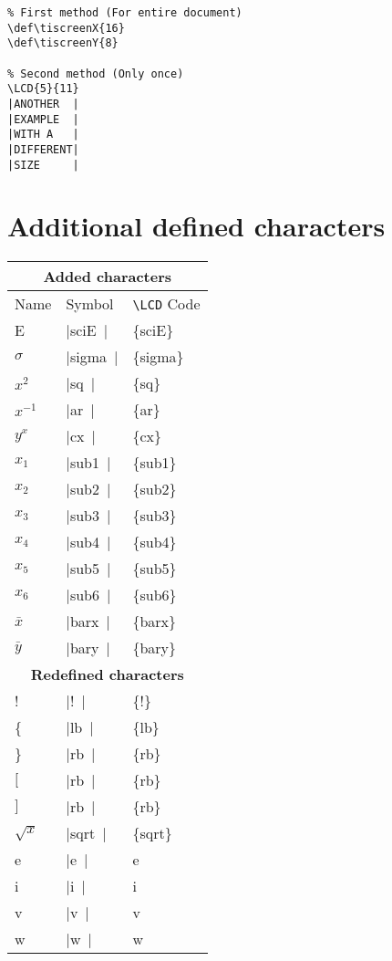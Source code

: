 \documentclass[a4paper,12pt]{article}
\newcommand{\LCDsymb}[1]{\large \textLCD{1}|{#1}~|}
\newcommand{\LCDcmd}{\texttt{\textbackslash LCD}}
\begin{document}
\begin{Verbatim}
% First method (For entire document)
\def\tiscreenX{16}
\def\tiscreenY{8}

% Second method (Only once)
\LCD{5}{11}
|ANOTHER  |
|EXAMPLE  |
|WITH A   |
|DIFFERENT|
|SIZE     |
\end{Verbatim}

\section{Additional defined characters} 
\begin{center}
	\begin{tabular}{|l|l|>{\ttfamily}l|}
		\multicolumn{3}{c}{\textbf{Added characters}} \\
		\hline
		Name       & Symbol          &\textnormal{\LCDcmd{} Code} \\
		\hline
		E          & \LCDsymb{sciE}  & \{sciE\} \\
		$\sigma$   & \LCDsymb{sigma} & \{sigma\} \\
		$x^2$      & \LCDsymb{sq}    & \{sq\} \\
		$x^{-1}$   & \LCDsymb{ar}    & \{ar\} \\
		$y^x$      & \LCDsymb{cx}    & \{cx\} \\
		$x_1$      & \LCDsymb{sub1}  & \{sub1\} \\
		$x_2$      & \LCDsymb{sub2}  & \{sub2\} \\
		$x_3$      & \LCDsymb{sub3}  & \{sub3\} \\
		$x_4$      & \LCDsymb{sub4}  & \{sub4\} \\
		$x_5$      & \LCDsymb{sub5}  & \{sub5\} \\
		$x_6$      & \LCDsymb{sub6}  & \{sub6\} \\
		$\bar x$   & \LCDsymb{barx}  & \{barx\} \\
		$\bar y$   & \LCDsymb{bary}  & \{bary\} \\
		\hline
		\multicolumn{3}{c}{\textbf{Redefined characters}} \\
		\hline
		!          & \LCDsymb{!}     & \{!\} \\
		\{         & \LCDsymb{lb}    & \{lb\} \\
		\}         & \LCDsymb{rb}    & \{rb\} \\
		$[$        & \LCDsymb{rb}    & \{rb\} \\
		$]$        & \LCDsymb{rb}    & \{rb\} \\
		$\sqrt{x}$ & \LCDsymb{sqrt}  & \{sqrt\} \\
		e          & \LCDsymb{e}     & e \\
		i          & \LCDsymb{i}     & i \\
		v          & \LCDsymb{v}     & v \\
		w          & \LCDsymb{w}     & w \\
		\hline
	\end{tabular}
\end{center}
\end{document}
